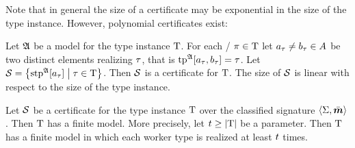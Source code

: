 Note that in general the size of a certificate may be exponential in
the size of the type instance. However, polynomial certificates exist:
\begin{lemma}\label{lem:cert-extract}
Let $\mathfrak{A}$ be a model for the type instance $\mathrm{T}$.
For each \twotype/ $\pi\in\mathrm{T}$ let $a_{\tau} \neq b_{\tau} \in A$
be two distinct elements realizing $\tau$, that is
$\operatorname{tp}^{\mathfrak{A}}[a_{\tau},b_{\tau}] = \tau$.
Let $\mathcal{S} = \left\{\operatorname{stp}^{\mathfrak{A}}[a_{\tau}]\mathrel{}\middle|\mathrel{}\tau \in \mathrm{T}\right\}$.
Then $\mathcal{S}$ is a certificate for $\mathrm{T}$.
The size of $\mathcal{S}$ is linear with respect to the size of the type instance.
\end{lemma}

\begin{lemma}\label{lem:cert-expand}
Let $\mathcal{S}$ be a certificate for the type instance $\mathrm{T}$ over the classified
signature $\left\langle \mathrm{\Sigma},\bar{\bm{m}} \right\rangle$.
Then $\mathrm{T}$ has a finite model.
More precisely, let $t \geq \left|\mathrm{T}\right|$ be a parameter.
Then $\mathrm{T}$ has a finite model in which each worker type is realized at least
$t$ times.
\end{lemma}
